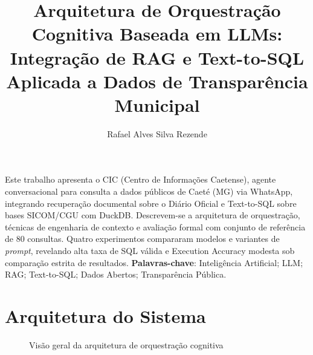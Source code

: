 \documentclass[
    12pt,
    openright,
    oneside,
    a4paper,
    brazil
]{abntex2}
\title{Arquitetura de Orquestração Cognitiva Baseada em LLMs: Integração de RAG e Text-to-SQL Aplicada a Dados de Transparência Municipal}
\author{Rafael Alves Silva Rezende}
\begin{document}
\pretextual
\imprimircapa
\imprimirfolhaderosto

\begin{resumo}
Este trabalho apresenta o CIC (Centro de Informações Caetense), agente conversacional para consulta a dados públicos de Caeté (MG) via WhatsApp, integrando recuperação documental sobre o Diário Oficial e Text-to-SQL sobre bases SICOM/CGU com DuckDB. Descrevem-se a arquitetura de orquestração, técnicas de engenharia de contexto e avaliação formal com conjunto de referência de 80 consultas. Quatro experimentos compararam modelos e variantes de \textit{prompt}, revelando alta taxa de SQL válida e Execution Accuracy modesta sob comparação estrita de resultados.
\vspace{\onelineskip}
\textbf{Palavras-chave}: Inteligência Artificial; LLM; RAG; Text-to-SQL; Dados Abertos; Transparência Pública.
\end{resumo}

\tableofcontents
\textual








\appendix
\chapter{Arquitetura do Sistema}
\label{ap:arquitetura}

\begin{figure}[htbp]
\centering
{}
\caption{Visão geral da arquitetura de orquestração cognitiva}
\label{fig:arquitetura}
\end{figure}
\end{document}
